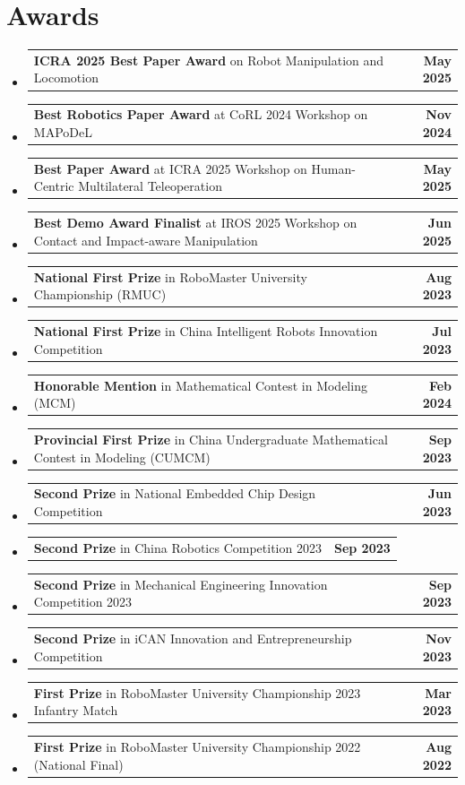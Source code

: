\documentclass[letterpaper,11pt]{article}
\makeatletter
\newif\iffullcv
\newcommand{\resumeProjectHeading}[2]{
    \item
    \begin{tabular*}{1.001\textwidth}{l@{\extracolsep{\fill}}r}
      \small#1 & \textbf{\small #2}\\
    \end{tabular*}\vspace{-9pt}
}
\makeatother
\begin{document}
\section{Awards}
  \begin{itemize}[leftmargin=0.0in, label={}, itemsep=-20pt]

    \resumeProjectHeading
      {\textbf{ICRA 2025 Best Paper Award} on Robot Manipulation and Locomotion}{May 2025}

    \resumeProjectHeading
      {\textbf{Best Robotics Paper Award} at CoRL 2024 Workshop on MAPoDeL}{Nov 2024}

    \resumeProjectHeading
      {\textbf{Best Paper Award} at ICRA 2025 Workshop on Human-Centric Multilateral Teleoperation}{May 2025}

    \resumeProjectHeading
      {\textbf{Best Demo Award Finalist} at IROS 2025 Workshop on Contact and Impact-aware Manipulation}{Jun 2025}

\iffullcv

    \resumeProjectHeading
      {\textbf{National First Prize} in RoboMaster University Championship (RMUC)}{Aug 2023}

    \resumeProjectHeading
      {\textbf{National First Prize} in China Intelligent Robots Innovation Competition}{Jul 2023}

    \resumeProjectHeading
      {\textbf{Honorable Mention} in Mathematical Contest in Modeling (MCM)}{Feb 2024}

    \resumeProjectHeading
      {\textbf{Provincial First Prize} in China Undergraduate Mathematical Contest in Modeling (CUMCM)}{Sep 2023}

    \resumeProjectHeading
      {\textbf{Second Prize} in National Embedded Chip Design Competition}{Jun 2023}

    \resumeProjectHeading
      {\textbf{Second Prize} in China Robotics Competition 2023}{Sep 2023}

    \resumeProjectHeading
      {\textbf{Second Prize} in Mechanical Engineering Innovation Competition 2023}{Sep 2023}

    \resumeProjectHeading
      {\textbf{Second Prize} in iCAN Innovation and Entrepreneurship Competition}{Nov 2023}

    \resumeProjectHeading
      {\textbf{First Prize} in RoboMaster University Championship 2023 Infantry Match}{Mar 2023}

    \resumeProjectHeading
      {\textbf{First Prize} in RoboMaster University Championship 2022 (National Final)}{Aug 2022}


\end{itemize}
\end{document}
